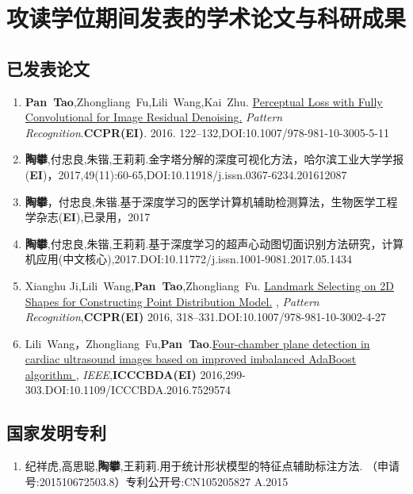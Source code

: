 
\chapter{攻读学位期间发表的学术论文与科研成果}

\section*{已发表论文}
\begin{enumerate}
\item {\textbf{Pan~Tao},Zhongliang~Fu,Lili~Wang,Kai~Zhu.
{\href{http://link.springer.com/10.1007/978-981-10-3005-5_11}
{Perceptual Loss with Fully Convolutional for Image Residual Denoising.}
{ \textit{Pattern Recognition}}.\textbf{CCPR(EI)}. 2016. 122--132,DOI:10.1007/978-981-10-3005-5-11}}

\item {\textbf{陶攀},付忠良,朱锴,王莉莉.{金字塔分解的深度可视化方法}，{哈尔滨工业大学学报(\textbf{EI})}，2017,49(11):60-65,DOI:10.11918/j.issn.0367-6234.201612087}

\item{\textbf{陶攀}，付忠良,朱锴.{基于深度学习的医学计算机辅助检测算法}，{生物医学工程学杂志(\textbf{EI}),已录用}，2017}
\item {\textbf{陶攀},付忠良,朱锴,王莉莉.{基于深度学习的超声心动图切面识别方法研究}，{计算机应用(中文核心),2017.DOI:10.11772/j.issn.1001-9081.2017.05.1434} }

\item{Xianghu Ji,Lili~Wang,\textbf{Pan~Tao},Zhongliang~Fu.
{\href{http://link.springer.com/10.1007/978-981-10-3002-4_27}{Landmark Selecting on 2D Shapes for Constructing Point Distribution Model.}
,{ \textit{Pattern Recognition}},\textbf{CCPR(EI)} 2016, 318--331.DOI:10.1007/978-981-10-3002-4-27}}

\item {Lili~Wang，Zhongliang~Fu,\textbf{Pan~Tao}.{\href{http://ieeexplore.ieee.org/document/7529574}
{Four-chamber plane detection in cardiac ultrasound images based on improved imbalanced AdaBoost algorithm },
{ \textit{IEEE}},\textbf{ICCCBDA(EI)} 2016,299-303.DOI:10.1109/ICCCBDA.2016.7529574}}

\end{enumerate}
\section*{国家发明专利}
\begin{enumerate}
\item { 纪祥虎,高思聪,\textbf{陶攀},王莉莉.{用于统计形状模型的特征点辅助标注方法. {（申请号:201510672503.8）专利公开号:CN105205827 A}.{2015}}}
\end{enumerate}
